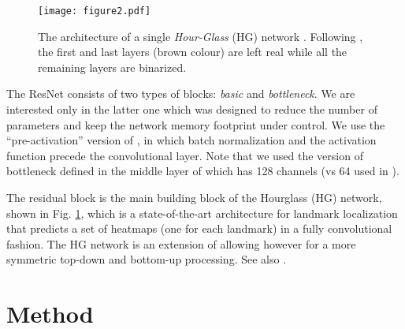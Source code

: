 \documentclass[10pt,journal,compsoc]{IEEEtran}
\begin{document}
\begin{figure}[!htb]
    \centering
    \texttt{[image: figure2.pdf]}
    \caption{The architecture of a single \textit{Hour-Glass} (HG) network \cite{newell2016stacked}. Following \cite{rastegari2016xnor}, the first and last layers {\color{black}(brown colour)} are left real while all the remaining layers are binarized.}
    \label{fig:network_small}
\end{figure}

The ResNet consists of two types of blocks: \textit{basic} and \textit{bottleneck}. We are interested only in the latter one which was designed to reduce the number of parameters and keep the network memory footprint under control. We use the ``pre-activation'' version of \cite{he2016identity}, in which batch normalization \cite{ioffe2015batch} and the activation function precede the convolutional layer. Note that we used the version of bottleneck defined in \cite{newell2016stacked} the middle layer of which has 128 channels (vs 64 used in \cite{he2016identity}).

The residual block is the main building block of the Hourglass (HG) network, shown in Fig. \ref{fig:network_small}, which is a state-of-the-art architecture for landmark localization that predicts a set of heatmaps (one for each landmark) in a fully convolutional fashion. The HG network is an extension of \cite{long2015fully} allowing however for a more symmetric top-down and bottom-up processing. See also \cite{newell2016stacked}.


\section{Method}\label{S:Method}
\end{document}
